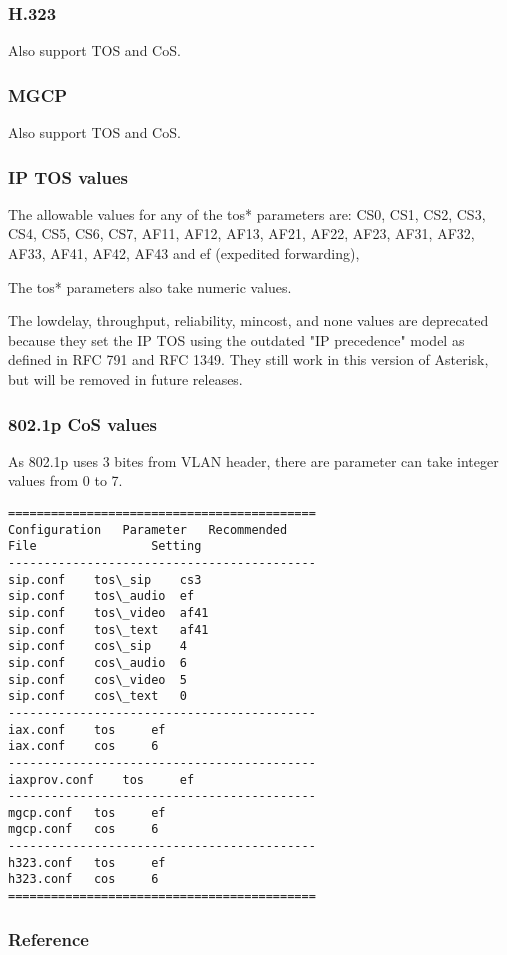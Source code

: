 \subsubsection{H.323}
Also support TOS and CoS. 

\subsubsection{MGCP}
Also support TOS and CoS.

\subsubsection{IP TOS values}

The allowable values for any of the tos* parameters are:
CS0, CS1, CS2, CS3, CS4, CS5, CS6, CS7, AF11, AF12, AF13,
AF21, AF22, AF23, AF31, AF32, AF33, AF41, AF42, AF43 and
ef (expedited forwarding),

The tos* parameters also take numeric values.

The lowdelay, throughput, reliability, mincost, and none values are
deprecated because they set the IP TOS using the outdated "IP
precedence" model as defined in RFC 791 and RFC 1349. They still
work in this version of Asterisk, but will be removed in future releases.

\subsubsection{802.1p CoS values}

As 802.1p uses 3 bites from VLAN header, there are parameter can take 
integer values from 0 to 7.


\begin{verbatim}
===========================================
Configuration	Parameter	Recommended
File				Setting
-------------------------------------------
sip.conf	tos\_sip	cs3
sip.conf	tos\_audio	ef
sip.conf	tos\_video	af41
sip.conf	tos\_text	af41
sip.conf	cos\_sip	4
sip.conf	cos\_audio	6
sip.conf	cos\_video	5
sip.conf	cos\_text	0
-------------------------------------------
iax.conf	tos		ef
iax.conf	cos		6	
-------------------------------------------
iaxprov.conf	tos		ef
-------------------------------------------
mgcp.conf	tos		ef
mgcp.conf	cos		6
-------------------------------------------
h323.conf	tos		ef
h323.conf	cos		6
===========================================
\end{verbatim}

\subsubsection{Reference}

